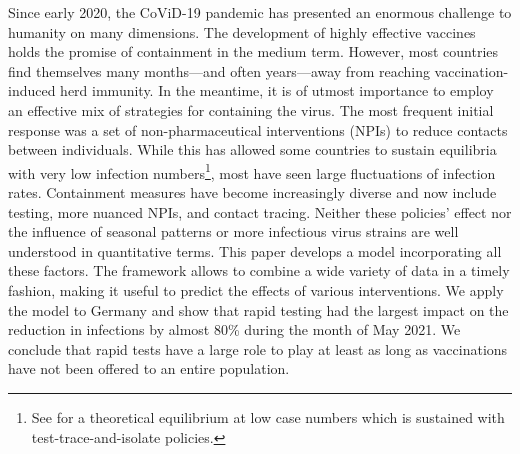 



Since early 2020, the CoViD-19 pandemic has presented an enormous challenge to humanity
on many dimensions. The development of highly effective vaccines holds the promise of
containment in the medium term. However, most countries find themselves many
months---and often years---away from reaching vaccination-induced herd
immunity. In the
meantime, it is of utmost importance to employ an effective mix of strategies for
containing the virus. The most frequent initial response was a set of non-pharmaceutical
interventions (NPIs) to reduce contacts between individuals. While this has allowed some
countries to sustain equilibria with very low infection numbers\footnote{See
\citet{Contreras2021} for a theoretical equilibrium at low case numbers which is
sustained with test-trace-and-isolate policies.}, most have seen large fluctuations of
infection rates. Containment measures have become increasingly diverse and now include
testing, more nuanced NPIs, and contact tracing. Neither these policies' effect nor the
influence of seasonal patterns or more infectious virus strains are well understood in
quantitative terms. This paper develops a model incorporating all these factors. The
framework allows to combine a wide variety of data in a timely fashion, making it useful
to predict the effects of various interventions. We apply the model to Germany and show
that rapid testing had the largest impact on the reduction in infections by almost 80\%
during the month of May 2021. We conclude that rapid tests have a large role to play at
least as long as vaccinations have not been offered to an entire population.

